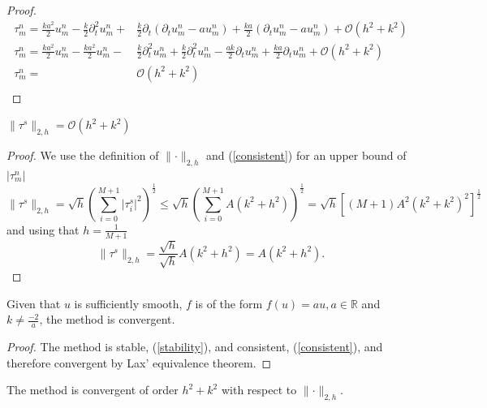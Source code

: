 \begin{proof}
    \begin{align*}
        \tau_m^n = \frac{ka^2}{2}u_{m}^{n}  - \frac{k}{2} \partial_t^2 u_{m}^{n} +& \frac{k}{2} \partial_t \left(\partial_t u_{m}^{n}   - au_{m}^{n} \right) + \frac{ka}{2} \left( \partial_t  u_{m}^{n} - a u_{m}^{n}\right)+ \mathcal{O}(h^2 + k^2) \\
        \tau_m^n = \frac{ka^2}{2}u_{m}^{n} - \frac{ka^2}{2}u_{m}^{n}  -& \frac{k}{2} \partial_t^2 u_{m}^{n} + \frac{k}{2} \partial_t^2 u_{m}^{n} - \frac{ak}{2} \partial_t u_{m}^{n} + \frac{ka}{2} \partial_t  u_{m}^{n}+ \mathcal{O}(h^2 + k^2) \\
        \tau_m^n =& \mathcal{O}(h^2 + k^2) \\
    \end{align*}
\end{proof}

\begin{corollary}
    \label{corollary:norm_tau}
    $\lVert\tau^s \lVert_{2, h} =\mathcal{O}(h^2+k^2)$
\end{corollary}

\begin{proof}
We use the definition of $\lVert\cdot\lVert_{2,h}$ and (\ref{consistent}) for an upper bound of $\lvert \tau_m^n\lvert$
    $$\lVert\tau^s \lVert_{2, h} = \sqrt{h}\left( \sum_{i=0}^{M+1} \lvert\tau^s_i \lvert^2 \right)^\frac{1}{2} \leq \sqrt{h}\left( \sum_{i=0}^{M+1} A(k^2+h^2) \right)^\frac{1}{2} = \sqrt{h}\left[ (M+1) A^2(k^2+k^2)^2 \right]^\frac{1}{2}$$
    and using that $h = \frac{1}{M+1}$
    $$\lVert\tau^s \lVert_{2, h} = \frac{\sqrt{h}}{\sqrt{h}}A(k^2+h^2) = A(k^2+h^2).$$
\end{proof}
\begin{theorem}
    \label{convergence_lax}
    Given that $u$ is sufficiently smooth,  $f$ is of the form $f(u)=au, a\in \mathbb{R}$ and $k \neq \frac{-2}{a}$, the method is convergent.
\end{theorem}

\begin{proof}
    The method is stable, (\ref{stability}), and consistent, (\ref{consistent}), and therefore convergent by Lax' equivalence theorem.
\end{proof}


\begin{theorem}
  \label{thm:conv_order}
    The method is convergent of order $h^2+k^2$ with respect to $\lVert\cdot \lVert_{2, h}$.
\end{theorem}

